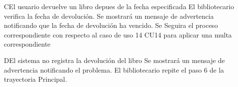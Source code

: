 		\begin{UCtrayectoriaA}{C}{El usuario devuelve un libro depues de la fecha especificada}
			\UCpaso[\UCactor] El bibliotecario verifica la fecha de devolución.
			\UCpaso[\UCsist] Se mostrará un mensaje de advertencia notificando que la fecha de devolución ha vencido. 
			\UCpaso[\UCsist] Se Seguira el proceso correspondiente con respecto al caso de uso 14 CU14 para aplicar una multa correspondiente
		\end{UCtrayectoriaA}


		\begin{UCtrayectoriaA}{D}{El sistema no registra la devolución del libro}
			\UCpaso[\UCsist] Se mostrará un mensaje de advertencia notificando el problema. 
			\UCpaso[\UCactor]El bibliotecario repite el paso 6 de la trayectoria Principal.
		\end{UCtrayectoriaA}

